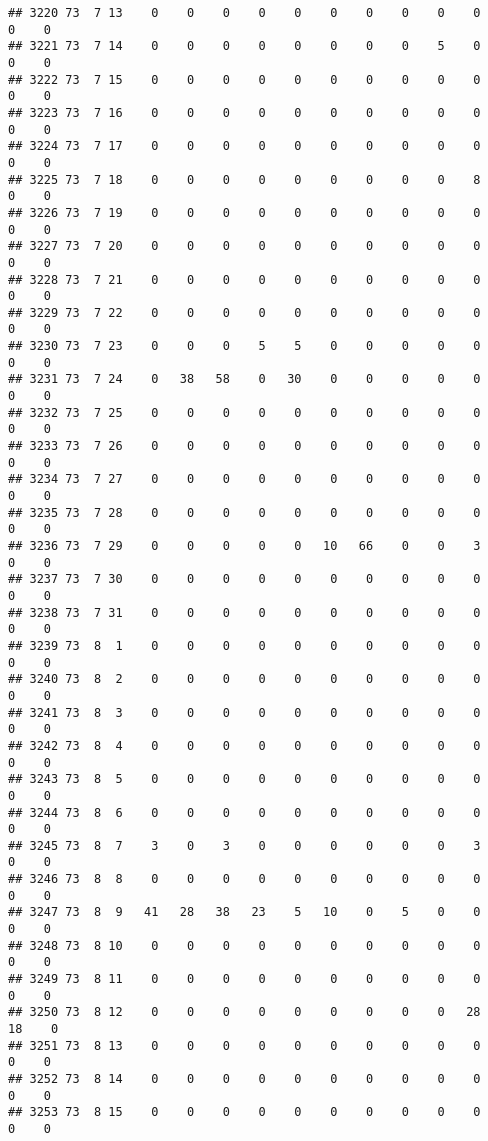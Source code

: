 \documentclass[]{article}
\begin{document}
\begin{verbatim}
## 3220 73  7 13    0    0    0    0    0    0    0    0    0    0    0    0
## 3221 73  7 14    0    0    0    0    0    0    0    0    5    0    0    0
## 3222 73  7 15    0    0    0    0    0    0    0    0    0    0    0    0
## 3223 73  7 16    0    0    0    0    0    0    0    0    0    0    0    0
## 3224 73  7 17    0    0    0    0    0    0    0    0    0    0    0    0
## 3225 73  7 18    0    0    0    0    0    0    0    0    0    8    0    0
## 3226 73  7 19    0    0    0    0    0    0    0    0    0    0    0    0
## 3227 73  7 20    0    0    0    0    0    0    0    0    0    0    0    0
## 3228 73  7 21    0    0    0    0    0    0    0    0    0    0    0    0
## 3229 73  7 22    0    0    0    0    0    0    0    0    0    0    0    0
## 3230 73  7 23    0    0    0    5    5    0    0    0    0    0    0    0
## 3231 73  7 24    0   38   58    0   30    0    0    0    0    0    0    0
## 3232 73  7 25    0    0    0    0    0    0    0    0    0    0    0    0
## 3233 73  7 26    0    0    0    0    0    0    0    0    0    0    0    0
## 3234 73  7 27    0    0    0    0    0    0    0    0    0    0    0    0
## 3235 73  7 28    0    0    0    0    0    0    0    0    0    0    0    0
## 3236 73  7 29    0    0    0    0    0   10   66    0    0    3    0    0
## 3237 73  7 30    0    0    0    0    0    0    0    0    0    0    0    0
## 3238 73  7 31    0    0    0    0    0    0    0    0    0    0    0    0
## 3239 73  8  1    0    0    0    0    0    0    0    0    0    0    0    0
## 3240 73  8  2    0    0    0    0    0    0    0    0    0    0    0    0
## 3241 73  8  3    0    0    0    0    0    0    0    0    0    0    0    0
## 3242 73  8  4    0    0    0    0    0    0    0    0    0    0    0    0
## 3243 73  8  5    0    0    0    0    0    0    0    0    0    0    0    0
## 3244 73  8  6    0    0    0    0    0    0    0    0    0    0    0    0
## 3245 73  8  7    3    0    3    0    0    0    0    0    0    3    0    0
## 3246 73  8  8    0    0    0    0    0    0    0    0    0    0    0    0
## 3247 73  8  9   41   28   38   23    5   10    0    5    0    0    0    0
## 3248 73  8 10    0    0    0    0    0    0    0    0    0    0    0    0
## 3249 73  8 11    0    0    0    0    0    0    0    0    0    0    0    0
## 3250 73  8 12    0    0    0    0    0    0    0    0    0   28   18    0
## 3251 73  8 13    0    0    0    0    0    0    0    0    0    0    0    0
## 3252 73  8 14    0    0    0    0    0    0    0    0    0    0    0    0
## 3253 73  8 15    0    0    0    0    0    0    0    0    0    0    0    0

\end{verbatim}
\end{document}
